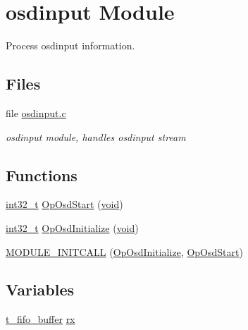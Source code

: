 \hypertarget{group__osdinput_module}{\section{osdinput Module}
\label{group__osdinput_module}
}


Process osdinput information.  


\subsection*{Files}
\begin{DoxyCompactItemize}
\item 
file \hyperlink{osdinput_8c}{osdinput.\-c}
\begin{DoxyCompactList}\small\item\em osdinput module, handles osdinput stream \end{DoxyCompactList}\end{DoxyCompactItemize}
\subsection*{Functions}
\begin{DoxyCompactItemize}
\item 
\hyperlink{group___n_a_m_e_gafd12020da5a235dfcf0c3c748fb5baed}{int32\-\_\-t} \hyperlink{group__osdinput_module_gaaba21100503d866b583940aa3bc550b3}{Op\-Osd\-Start} (\hyperlink{group___n_a_m_e_ga18028b8badbf1ea7e704ccac3c488e82}{void})
\item 
\hyperlink{group___n_a_m_e_gafd12020da5a235dfcf0c3c748fb5baed}{int32\-\_\-t} \hyperlink{group__osdinput_module_ga312c7d8bcb66b8430bd009bd7128bba7}{Op\-Osd\-Initialize} (\hyperlink{group___n_a_m_e_ga18028b8badbf1ea7e704ccac3c488e82}{void})
\item 
\hyperlink{group__osdinput_module_ga31db709dbe6f535319711b191f1ef781}{M\-O\-D\-U\-L\-E\-\_\-\-I\-N\-I\-T\-C\-A\-L\-L} (\hyperlink{group__osdinput_module_ga312c7d8bcb66b8430bd009bd7128bba7}{Op\-Osd\-Initialize}, \hyperlink{group__osdinput_module_gaaba21100503d866b583940aa3bc550b3}{Op\-Osd\-Start})
\end{DoxyCompactItemize}
\subsection*{Variables}
\begin{DoxyCompactItemize}
\item 
\hyperlink{structt__fifo__buffer}{t\-\_\-fifo\-\_\-buffer} \hyperlink{group__osdinput_module_ga666084f476b4a75298efd53fc6dc3203}{rx}
\end{DoxyCompactItemize}


